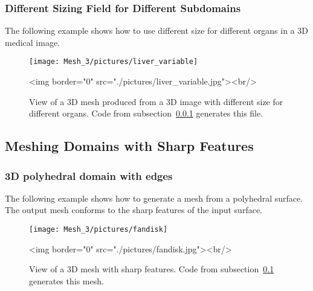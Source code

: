 \subsubsection{Different Sizing Field for Different Subdomains}
\label{Mesh_3_subsubsection_examples_3d_image_variable}

The following example shows how to use different size for different organs in
a 3D medical image.


\begin{figure}[ht]
\begin{center}
 \begin{ccTexOnly}
   \texttt{[image: Mesh\_3/pictures/liver\_variable]}
 \end{ccTexOnly}
 \begin{ccHtmlOnly}
   <img border="0" src="./pictures/liver_variable.jpg"><br/>
 \end{ccHtmlOnly}
 \caption{View of a 3D mesh produced from a 3D image with different size for
 different organs. Code from
 subsection~\ref{Mesh_3_subsubsection_examples_3d_image_variable} generates this file.}
  \label{figure:liver_variable_mesh}
\end{center}
\end{figure}


\subsection{Meshing Domains with Sharp Features}
\label{Mesh_3_subsection_example_polyhedral_with_edges}

\subsubsection{3D polyhedral domain with edges }
The following example shows how to generate a mesh from a polyhedral
surface. The output mesh conforms to the sharp features of the input surface.


\begin{figure}[ht]
\begin{center}
 \begin{ccTexOnly}
   \texttt{[image: Mesh\_3/pictures/fandisk]}
 \end{ccTexOnly}
 \begin{ccHtmlOnly}
   <img border="0" src="./pictures/fandisk.jpg"><br/>
 \end{ccHtmlOnly}
 \caption{View of a 3D mesh with sharp features. Code from
 subsection~\ref{Mesh_3_subsection_example_polyhedral_with_edges} generates this mesh.}
  \label{figure:fandisk_mesh}
\end{center}
\end{figure}


